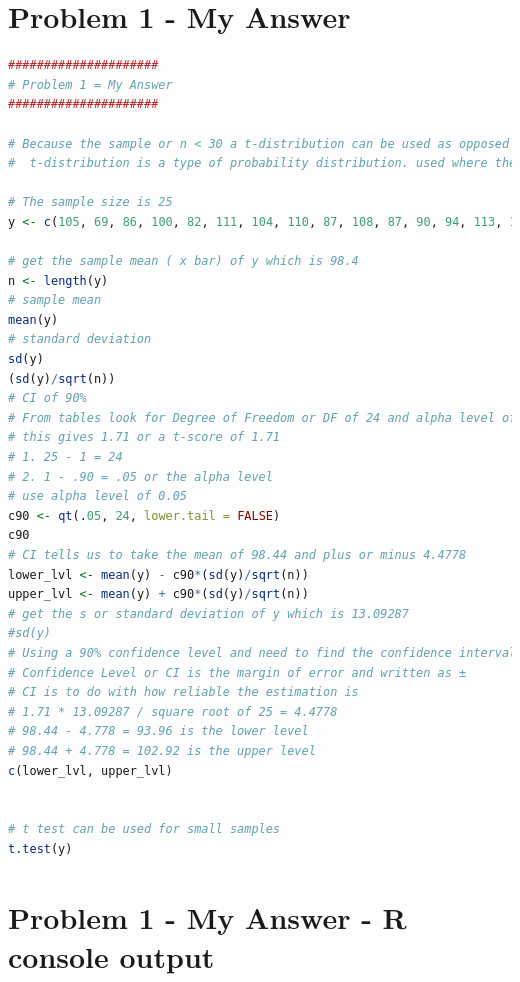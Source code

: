 \documentclass[12pt,letterpaper]{article}
\begin{document}
\section*{Problem 1 - My Answer}
	


\begin{lstlisting}[language=R]
#####################
# Problem 1 = My Answer
#####################

# Because the sample or n < 30 a t-distribution can be used as opposed to a normal distribution
#  t-distribution is a type of probability distribution. used where the sample size is small.

# The sample size is 25
y <- c(105, 69, 86, 100, 82, 111, 104, 110, 87, 108, 87, 90, 94, 113, 112, 98, 80, 97, 95, 111, 114, 89, 95, 126, 98)

# get the sample mean ( x bar) of y which is 98.4
n <- length(y) 
# sample mean
mean(y)
# standard deviation
sd(y)
(sd(y)/sqrt(n))
# CI of 90%
# From tables look for Degree of Freedom or DF of 24 and alpha level of 0.05
# this gives 1.71 or a t-score of 1.71
# 1. 25 - 1 = 24
# 2. 1 - .90 = .05 or the alpha level
# use alpha level of 0.05
c90 <- qt(.05, 24, lower.tail = FALSE)
c90
# CI tells us to take the mean of 98.44 and plus or minus 4.4778
lower_lvl <- mean(y) - c90*(sd(y)/sqrt(n))
upper_lvl <- mean(y) + c90*(sd(y)/sqrt(n))
# get the s or standard deviation of y which is 13.09287
#sd(y)
# Using a 90% confidence level and need to find the confidence interval
# Confidence Level or CI is the margin of error and written as ±
# CI is to do with how reliable the estimation is
# 1.71 * 13.09287 / square root of 25 = 4.4778
# 98.44 - 4.778 = 93.96 is the lower level
# 98.44 + 4.778 = 102.92 is the upper level
c(lower_lvl, upper_lvl)


# t test can be used for small samples
t.test(y)

\end{lstlisting}
	
\newpage

\section*{Problem 1 - My Answer  - R console output}
	
\end{document}

